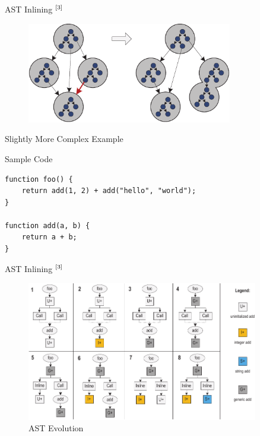 \documentclass[xcolor=dvipsname,handout]{beamer}
\newcommand{\up}[1]{\ensuremath{^{{\tiny#1}}}}
\begin{document}
\begin{frame}[fragile]{AST Inlining \up{[3]}}
  \begin{figure}
    \centering
    \includegraphics[width=0.8\textwidth]{image02-2.pdf}
    \label{fig:inlining}
  \end{figure}
\end{frame}

\begin{frame}[fragile]{Slightly More Complex Example}
    \begin{block}{Sample Code}
    \begin{lstlisting}
function foo() {
    return add(1, 2) + add("hello", "world");
}

function add(a, b) {
    return a + b;
}
    \end{lstlisting}
    \end{block}
\end{frame}

\begin{frame}[fragile]{AST Inlining \up{[3]}}
  \begin{figure}
    \centering
    \includegraphics[width=0.9\textwidth]{image01-2.pdf}
    \caption{AST Evolution}
    \label{fig:inlining2}
  \end{figure}
\end{frame}
\end{document}
